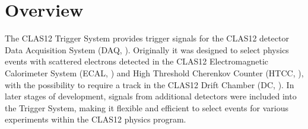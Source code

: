 \section{Overview}

The CLAS12 Trigger System provides trigger signals for the CLAS12 detector Data Acquisition System (DAQ, \cite{daq-nim}). Originally it was designed to select physics events with scattered electrons detected in the CLAS12 Electromagnetic Calorimeter System (ECAL, \cite{ec-ref}) and High Threshold Cherenkov Counter (HTCC, \cite{htcc-ref}), with the possibility to require a track in the CLAS12 Drift Chamber (DC, \cite{dc-ref}). In later stages of development, signals from additional detectors were included into the Trigger System, making it flexible and efficient to select events for various experiments within the CLAS12 physics program.



